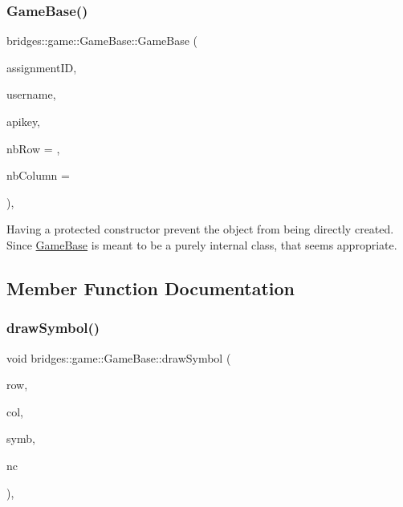 \subsubsection{\texorpdfstring{Game\+Base()}{GameBase()}}
{\footnotesize\ttfamily bridges\+::game\+::\+Game\+Base\+::\+Game\+Base (\begin{DoxyParamCaption}\item[{int}]{assignment\+ID,  }\item[{std\+::string}]{username,  }\item[{std\+::string}]{apikey,  }\item[{int}]{nb\+Row = {},  }\item[{int}]{nb\+Column = {} }\end{DoxyParamCaption})\hspace{0.3cm}{\ttfamily [inline]}, {\ttfamily [protected]}}

Having a protected constructor prevent the object from being directly created. Since \mbox{\hyperlink{classbridges_1_1game_1_1_game_base}{Game\+Base}} is meant to be a purely internal class, that seems appropriate. 

\subsection{Member Function Documentation}
\mbox{\label{classbridges_1_1game_1_1_game_base_a415fa8f70bef364dfa966f2a86048901}} 
\subsubsection{\texorpdfstring{draw\+Symbol()}{drawSymbol()}}
{\footnotesize\ttfamily void bridges\+::game\+::\+Game\+Base\+::draw\+Symbol (\begin{DoxyParamCaption}\item[{int}]{row,  }\item[{int}]{col,  }\item[{\mbox{\hyperlink{namespacebridges_1_1game_ab9a19c7ab6e2ebac2f95180e21733487}{Named\+Symbol}}}]{symb,  }\item[{\mbox{\hyperlink{namespacebridges_1_1game_afaa832a4322b25b6a4ebfba832f10f26}{Named\+Color}}}]{nc }\end{DoxyParamCaption})\hspace{0.3cm}{\ttfamily [inline]}, {\ttfamily [protected]}}



